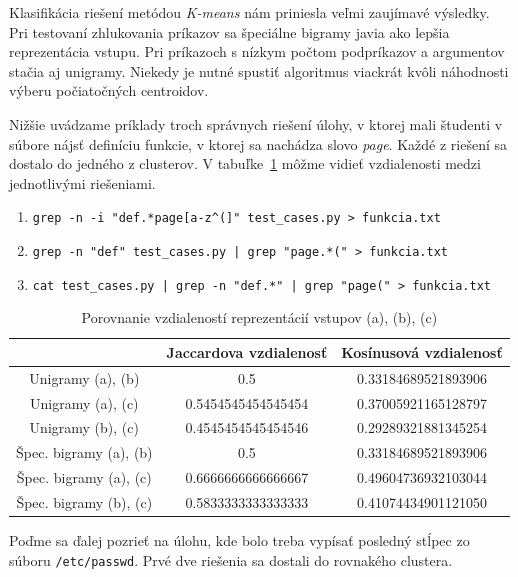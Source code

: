 Klasifikácia riešení metódou \textit{K-means} nám priniesla veľmi zaujímavé výsledky.
Pri testovaní zhlukovania príkazov sa špeciálne bigramy javia ako
lepšia reprezentácia vstupu. Pri príkazoch s nízkym počtom podpríkazov a argumentov
stačia aj unigramy. Niekedy je nutné spustiť algoritmus viackrát kvôli náhodnosti
výberu počiatočných centroidov.

Nižšie uvádzame príklady troch správnych riešení úlohy, v ktorej mali študenti v súbore 
nájsť definíciu funkcie, v ktorej sa nachádza slovo \textit{page}. Každé z riešení sa
dostalo do jedného z clusterov. V tabuľke~\ref{tab:distances} môžme vidieť vzdialenosti
medzi jednotlivými riešeniami.
\begin{enumerate}[label=(\alph*)]
	\item \verb'grep -n -i "def.*page[a-z^(]" test_cases.py > funkcia.txt'
	\item \verb'grep -n "def" test_cases.py | grep "page.*(" > funkcia.txt'
	\item \verb'cat test_cases.py | grep -n "def.*" | grep "page(" > funkcia.txt'
\end{enumerate}

\begin{table}[h]
	\centering
	\begin{tabular}{|c||c|c|} 
		\hline
		& Jaccardova vzdialenosť
		& Kosínusová vzdialenosť\\
		\hline
		Unigramy (a), (b) & 0.5 & 0.33184689521893906\\
		\hline
		Unigramy (a), (c) & 0.5454545454545454 & 0.37005921165128797\\
		\hline
		Unigramy (b), (c) & 0.4545454545454546 & 0.29289321881345254\\
		\Xhline{1.5pt}
		Špec. bigramy (a), (b) & 0.5 & 0.33184689521893906\\
		\hline
		Špec. bigramy (a), (c) & 0.6666666666666667 & 0.49604736932103044\\
		\hline
		Špec. bigramy (b), (c) & 0.5833333333333333 & 0.41074434901121050\\
		\hline
	\end{tabular}
	\caption[Porovnanie vzdialeností reprezentácií vstupov (a), (b), (c)]{Porovnanie vzdialeností reprezentácií vstupov (a), (b), (c)}
	\label{tab:distances}
\end{table}

Poďme sa ďalej pozrieť na úlohu, kde bolo treba vypísať posledný stĺpec zo súboru
\verb'/etc/passwd'. Prvé dve riešenia sa dostali do rovnakého clustera.

